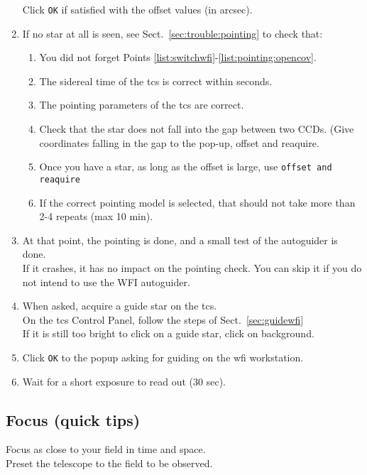 \documentclass[11pt,fleqn]{book} %
\begin{document}
\begin{enumerate}
        Click \texttt{OK} if satisfied with the offset values (in arcsec).
  \item If no star at all is seen, see 
    Sect.~\ref{sec:trouble:pointing} to check that:
    \begin{enumerate}
      \item You did not forget Points \ref{list:switchwfi}-\ref{list:pointing:opencov}.
      \item The sidereal time of the \gls{tcs} is correct within seconds.
      \item The pointing parameters of the \gls{tcs} are correct.
      \item Check that the star does not fall into the gap between two CCDs. (Give coordinates falling in the gap to the pop-up, offset and reaquire. 
      \item Once you have a star, as long as the offset is large, use \texttt{offset and reaquire}
      \item If the correct pointing model is selected, that should not take more than 2-4 repeats (max 10 min).
    \end{enumerate}
  \item At that point, the pointing is done, and a small test of the
        autoguider is done.\\
        If it crashes, it has no impact on the pointing
        check.  You can skip it if you do not intend to use the WFI autoguider.
  \item When asked, acquire a guide star on the \gls{tcs}.\\
        On the \gls{tcs} Control Panel, follow the steps of Sect.~\ref{sec:guidewfi}\\
        If it is still too bright to click on a guide star, click on background.
  \item Click \texttt{OK} to the popup asking for guiding on the \gls{wfi} workstation.
  \item Wait for a short exposure to read out (30 sec).
\end{enumerate}

\subsection{Focus (quick tips)}

Focus as close to your field in time and space. \\
Preset the telescope to the field to be observed.
\end{document}
